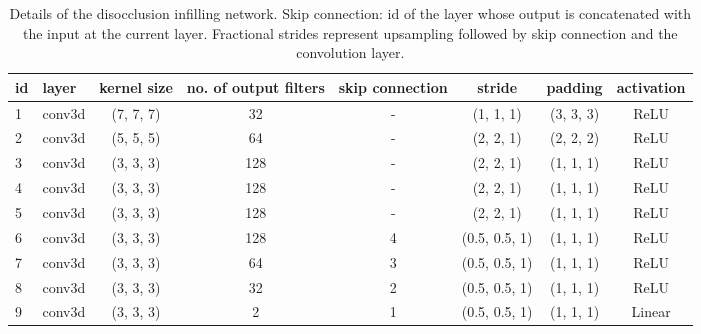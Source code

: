 \documentclass[preprint]{vgtc}
\begin{document}
    \begin{table*}
        \centering
        \begin{tabular}{l|lcccccc}
            \hline
            \textbf{id} & \textbf{layer} & \textbf{kernel size} & \textbf{no. of output filters} & \textbf{skip connection} & \textbf{stride} & \textbf{padding} & \textbf{activation} \\
            \hline
            1 & conv3d & (7, 7, 7) & 32 & - & (1, 1, 1) & (3, 3, 3) & ReLU \\
            2 & conv3d & (5, 5, 5) & 64 & - & (2, 2, 1) & (2, 2, 2) & ReLU \\
            3 & conv3d & (3, 3, 3) & 128 & - & (2, 2, 1) & (1, 1, 1) & ReLU \\
            4 & conv3d & (3, 3, 3) & 128 & - & (2, 2, 1) & (1, 1, 1) & ReLU \\
            5 & conv3d & (3, 3, 3) & 128 & - & (2, 2, 1) & (1, 1, 1) & ReLU \\
            6 & conv3d & (3, 3, 3) & 128 & 4& (0.5, 0.5, 1) & (1, 1, 1) & ReLU \\
            7 & conv3d & (3, 3, 3) & 64 & 3& (0.5, 0.5, 1) & (1, 1, 1) & ReLU \\
            8 & conv3d & (3, 3, 3) & 32 & 2& (0.5, 0.5, 1) & (1, 1, 1) & ReLU \\
            9 & conv3d & (3, 3, 3) & 2 & 1& (0.5, 0.5, 1) & (1, 1, 1) & Linear \\
            \hline
        \end{tabular}
        \caption{Details of the disocclusion infilling network. Skip connection: id of the layer whose output is concatenated with the input at the current layer. Fractional strides represent upsampling followed by skip connection and the convolution layer.}
        \label{tab:network-architecture-infilling}
    \end{table*}
\end{document}

